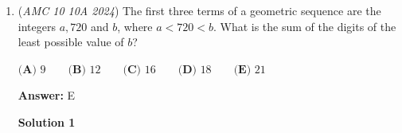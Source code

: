 \begin{enumerate}
 Our answer is \( 7+5+8= \) $\boxed{\text{(D) }20}$.

 



\textbf{Solution 5 (Factoring)}

Start similar to other solutions.

 
 \[b^3+b+2 \equiv 0\pmod 8\]

 Except now we notice the following:

 \begin{align*}b^3+8+b+2 \equiv 8\pmod 8 \equiv 0\pmod 8\\(b+2)(b^2-2b+4) + b+2 \equiv 0\pmod 8\\(b+2)(b^2-2b+5) \equiv 0\pmod 8\\\end{align*}


 Notice that $b+2$ and $b^2-2b+5$ have opposite parity, and when multiplied, is divisible by $8$. Thus, either $b+2$ or $b^2-2b+5$ is divisible by $8$.

 $b+2$ is obvious, where $b+2 | 8$ when $b \equiv 6\pmod 8$

 When testing for $b^2-2b+5 | 8$, we find $b \equiv 3, 7\pmod 8$

 Proceed similar to the other solutions, $\lfloor\dfrac{3}{8} \cdot 2024\rfloor-1=759-1=758$, where $7+5+8=\boxed{\text{(D) }20}$




\textbf{Solution 6}

$2024_b =2b^3 +2b+4 \equiv 0 \pmod {16} \to 2b^3 +2b \equiv 12 \pmod {16}$. 

 Dividing everything by $2$ gives: 

 
 \[b^3+b \equiv 6 \pmod {\frac{16}{gcd(16,2)}} \to b(b^2 +1)\equiv 6 \pmod {8}\].

 Then proceed in the same manner as the solutions above to get a final answer of $\boxed{\textbf{(D) 20}}$. 

 


	\item (\textit{AMC 10 10A 2024}) The first three terms of a geometric sequence are the integers $a, 720$ and $b$, where $a < 720 < b$. What is the sum of the digits of the least possible value of $b$?


 $\textbf{(A) } 9\qquad\textbf{(B) } 12\qquad\textbf{(C) } 16\qquad\textbf{(D) } 18\qquad\textbf{(E) } 21$

 \textbf{Answer: }E



\textbf{Solution 1}


\end{enumerate}
